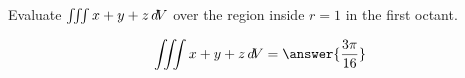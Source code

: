 \documentclass{ximera}
\author{David Guichard \and Neal Koblitz \and H. Jerome Keisler \and Albert Scheller \and Barry Balof \and Mike Wills \and Matthew Carr}
\begin{document}
\begin{exercise}




Evaluate $\iiint x+y+z \mathop{}\!d\! V$ over the region inside $r=1$ in the first octant.

\begin{prompt}
\[
\iiint x+y+z \d V=\answer{\frac{3\pi}{16}}
\]
\end{prompt}



\end{exercise}
\end{document}
